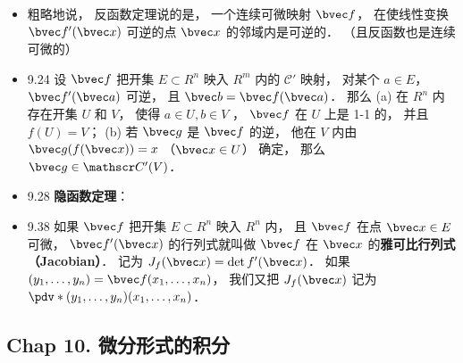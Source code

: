 \begin{itemize}
\item 粗略地说， 反函数定理说的是， 一个连续可微映射 $\bvec f$， 在使线性变换 $\bvec f'(\bvec x)$ 可逆的点 $\bvec x$ 的邻域内是可逆的． （且反函数也是连续可微的）

\item 9.24 设 $\bvec f$ 把开集 $E\subset R^n$ 映入 $R^m$ 内的 $\mathscr C'$ 映射， 对某个 $a\in E$， $\bvec f'(\bvec a)$ 可逆， 且 $\bvec b = \bvec f(\bvec a)$． 那么 (a) 在 $R^n$ 内存在开集 $U$ 和 $V$， 使得 $a\in U, b\in V$ ， $\bvec f$ 在 $U$ 上是 1-1 的， 并且 $f(U) = V$； (b) 若 $\bvec g$ 是 $\bvec f$ 的逆， 他在 $V$ 内由 $\bvec g(f(\bvec x)) = x$ （$\bvec x\in U$） 确定， 那么 $\bvec g\in \mathscr C'(V)$．

\item 9.28 \textbf{隐函数定理}： 

\item 9.38 如果 $\bvec f$ 把开集 $E\subset R^n$ 映入 $R^n$ 内， 且 $\bvec f$ 在点 $\bvec x\in E$ 可微， $\bvec f'(\bvec x)$ 的行列式就叫做 $\bvec f$ 在 $\bvec x$ 的\textbf{雅可比行列式（Jacobian）}． 记为 $J_f(\bvec x) = \det f'(\bvec x)$． 如果 $(y_1,\dots,y_n)=\bvec f(x_1,\dots, x_n)$， 我们又把 $J_f(\bvec x)$ 记为 $\pdv*{(y_1,\dots,y_n)}{(x_1,\dots, x_n)}$．
\end{itemize}

\subsection{Chap 10. 微分形式的积分}

